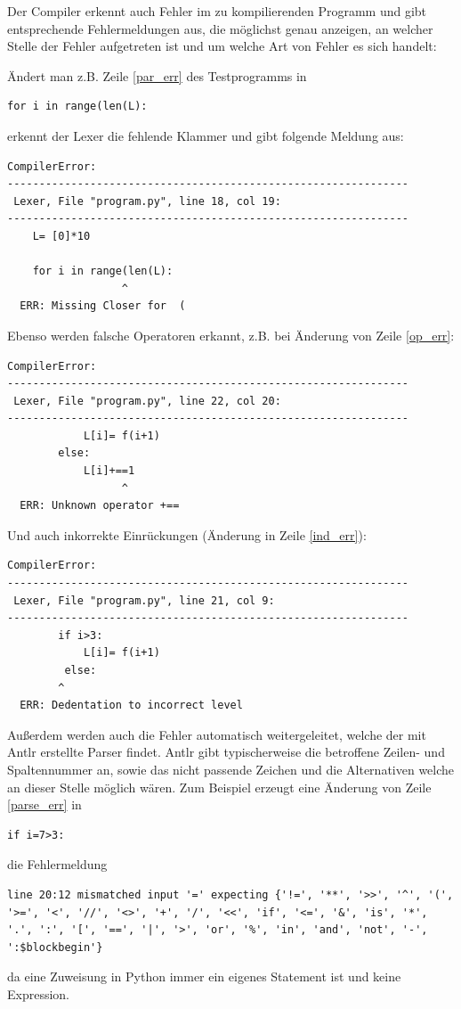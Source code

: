 Der Compiler erkennt auch Fehler im zu kompilierenden Programm und gibt entsprechende Fehlermeldungen aus, die möglichst genau anzeigen, an welcher Stelle der Fehler aufgetreten ist und um welche Art von Fehler es sich handelt:

Ändert man z.B. Zeile \ref{par_err} des Testprogramms in
\begin{lstlisting}
for i in range(len(L):
\end{lstlisting}

erkennt der Lexer die fehlende Klammer und gibt folgende Meldung aus:
\begin{lstlisting}
CompilerError: 
---------------------------------------------------------------
 Lexer, File "program.py", line 18, col 19:
---------------------------------------------------------------
    L= [0]*10

    for i in range(len(L):
                  ^
  ERR: Missing Closer for  ( 
\end{lstlisting}

\clearpage

Ebenso werden falsche Operatoren erkannt, z.B. bei Änderung von Zeile \ref{op_err}:
\begin{lstlisting}
CompilerError: 
---------------------------------------------------------------
 Lexer, File "program.py", line 22, col 20:
---------------------------------------------------------------
            L[i]= f(i+1)
        else:
            L[i]+==1
                  ^
  ERR: Unknown operator +==
\end{lstlisting}

Und auch inkorrekte Einrückungen (Änderung in Zeile \ref{ind_err}):
\begin{lstlisting}
CompilerError: 
---------------------------------------------------------------
 Lexer, File "program.py", line 21, col 9:
---------------------------------------------------------------
        if i>3:
            L[i]= f(i+1)
         else:
        ^
  ERR: Dedentation to incorrect level  
\end{lstlisting}

Außerdem werden auch die Fehler automatisch weitergeleitet, welche der mit Antlr erstellte Parser findet. Antlr gibt typischerweise die betroffene Zeilen- und Spaltennummer an, sowie das nicht passende Zeichen und die Alternativen welche an dieser Stelle möglich wären. Zum Beispiel erzeugt eine Änderung von Zeile \ref{parse_err} in
\begin{lstlisting}
if i=7>3:
\end{lstlisting}
die Fehlermeldung
\begin{lstlisting}
line 20:12 mismatched input '=' expecting {'!=', '**', '>>', '^', '(', '>=', '<', '//', '<>', '+', '/', '<<', 'if', '<=', '&', 'is', '*', '.', ':', '[', '==', '|', '>', 'or', '%', 'in', 'and', 'not', '-', ':$blockbegin'}
\end{lstlisting}
da eine Zuweisung in Python immer ein eigenes Statement ist und keine Expression.\\


